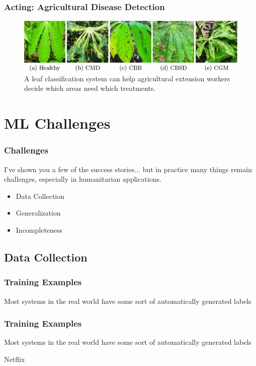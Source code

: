 \documentclass[10pt,mathserif]{beamer}
\begin{document}
\begin{frame}
  \frametitle{Acting: Agricultural Disease Detection}
  \begin{figure}[ht]
    \centering
    \includegraphics[options]{figures/cassava}
    \caption{A leaf classification system can help agricultural extension
      workers decide which areas need which treatments. \label{fig:cassava} }
  \end{figure}

\end{frame}

\section{ML Challenges}
\label{sec:label}

\begin{frame}
  \frametitle{Challenges}

  I've shown you a few of the success stories... but in practice many things
  remain challenges, especially in humanitarian applications.

  \begin{itemize}
  \item Data Collection
  \item Generalization
  \item Incompleteness
  \end{itemize} 
\end{frame}

\subsection{Data Collection}
\label{subsec:label}

\begin{frame}
  \frametitle{Training Examples}
  Most systems in the real world have some sort of automatically generated labels
\end{frame}

\begin{frame}
  \frametitle{Training Examples}
  Most systems in the real world have some sort of automatically generated labels

  Netflix
\end{frame}
\end{document}
